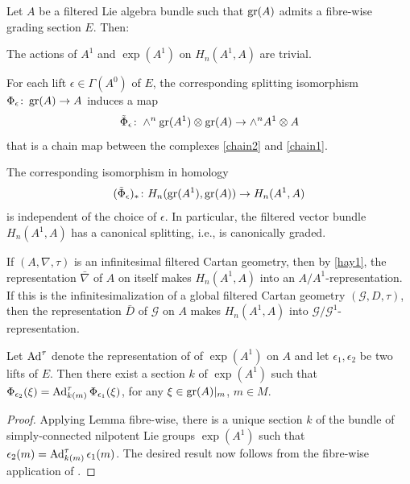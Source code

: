 \documentclass[leqno,12pt]{amsart} %
\begin{document}
\begin{proposition}
  Let $A$ be a filtered Lie algebra bundle such that $\operatorname{\operatorname{gr}}(A)$ admits a fibre-wise
  grading section $E$. Then:
  \begin{conditions}
  \item The actions of $A^1 $ and $\exp(A^1)$ on $H_n(A^1, A)$ are trivial.  \label{hay1}
  \item For each lift $\epsilon \in \Gamma(A^0)$ of $E$, the corresponding splitting
    isomorphism $\Phi_\epsilon \colon \operatorname{\operatorname{gr}}(A) \rightarrow A$ induces a map
    $$\tilde \Phi_\epsilon \colon \wedge^n \operatorname{\operatorname{gr}}(A^1) \otimes \operatorname{\operatorname{gr}}(A) \rightarrow \wedge^n A^1 \otimes A$$
    that is a chain map between the complexes \eqref{chain2} and \eqref{chain1}.
    \label{hay2}
  \item The corresponding isomorphism in homology
    $$ (\tilde \Phi_\epsilon)_* \colon H_n(\operatorname{\operatorname{gr}}(A^1), \operatorname{\operatorname{gr}}(A)) \rightarrow H_n(A^1, A)$$
    is independent of the choice of $\epsilon$. In particular, the filtered vector bundle
    $H_n(A^1, A)$ has a canonical splitting, i.e., is canonically graded. \label{hay3}
  \end{conditions}
\end{proposition}

\begin{remark}
  If $(A, \nabla, \tau)$ is an infinitesimal filtered Cartan geometry, then by
  \eqref{hay1}, the representation $\bar\nabla $ of $A$ on itself makes $H_n(A^1,A)$ into
  an $A/A^1$-representation. If this is the infinitesimalization of a global filtered
  Cartan geometry $({\mathcal G}, D, \tau)$, then the representation $\bar D $ of
  ${\mathcal G} $ on $A$ makes $H_n(A^1,A)$ into
  ${\mathcal G}/{\mathcal G}^1$-representation.
\end{remark}

\begin{lemma}
  Let $\operatorname{Ad}^\tau $ denote the representation of of $\exp(A^1)$ on $A$ and let
  $\epsilon_1, \epsilon_2$ be two lifts of $E$. Then there exist a section $k$ of
  $\exp(A^1)$ such that
  $\Phi_{\epsilon_2}(\xi) = \operatorname{Ad}^\tau_{k(m)}\Phi_{\epsilon_1}(\xi)$, for any
  $\xi \in \operatorname{\operatorname{gr}}(A)|_{m}$, $m \in M$.
\end{lemma}
\begin{proof}
  Applying Lemma  fibre-wise, there is a unique section
  $k $ of the bundle of simply-connected nilpotent Lie groups $\exp(A^1)$ such that
  $\epsilon_2(m) = \operatorname{Ad}^\tau_{k(m)} \epsilon_1(m)$. The desired result now follows
  from the fibre-wise application of .
\end{proof}
\end{document}
